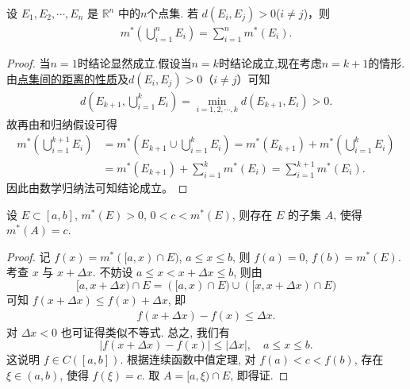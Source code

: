 \documentclass[../../main.tex]{subfiles}
\begin{document}
\begin{corollary}\label{corollary:距离大于零的两个点集的外测度满足可数可加性}
设 \(E_1, E_2,\cdots,E_n\) 是 \(\mathbb{R}^n\) 中的$n$个点集. 若 \(d(E_i, E_j)>0\)($i\ne j$)，则
\begin{align*}
m^*\left( \bigcup_{i=1}^n{E_i} \right) =\sum_{i=1}^n{m^*\left( E_i \right)}.
\end{align*}
\end{corollary}
\begin{proof}
当$n=1$时结论显然成立.假设当$n=k$时结论成立,现在考虑$n=k+1$的情形.由\hyperref[proposition:点集间的距离的性质]{点集间的距离的性质}及$d(E_i,E_j)>0$（$i\neq j$）可知
\begin{align*}
d\left(E_{k + 1},\bigcup_{i = 1}^kE_i\right)=\min_{i = 1,2,\cdots,k}d\left(E_{k + 1},E_i\right)>0.
\end{align*}
故再由和归纳假设可得
\begin{align*}
m^*\left(\bigcup_{i = 1}^{k + 1}E_i\right)&=m^*\left(E_{k + 1}\cup\bigcup_{i = 1}^kE_i\right)=m^*\left(E_{k + 1}\right)+m^*\left(\bigcup_{i = 1}^kE_i\right)\\
&=m^*\left(E_{k + 1}\right)+\sum_{i = 1}^km^*(E_i)
=\sum_{i = 1}^{k + 1}m^*(E_i).
\end{align*}
因此由数学归纳法可知结论成立。 
\end{proof}

\begin{proposition}\label{proposition:Lebesgue外测度的内介值性}
设 \(E \subset [a,b]\), \(m^*(E)>0\), \(0 < c < m^*(E)\), 则存在 \(E\) 的子集 \(A\), 使得 \(m^*(A)=c\).
\end{proposition}
\begin{proof}
记 \(f(x)=m^*([a,x) \cap E)\), \(a \leq x \leq b\), 则 \(f(a)=0\), \(f(b)=m^*(E)\). 考查 \(x\) 与 \(x + \Delta x\). 不妨设 \(a \leq x < x + \Delta x \leq b\), 则由
\[
[a,x + \Delta x) \cap E = ([a,x) \cap E) \cup ([x,x + \Delta x) \cap E)
\]
可知 \(f(x + \Delta x) \leq f(x) + \Delta x\), 即
\begin{align*}
f(x + \Delta x) - f(x) \leq \Delta x.
\end{align*}
对 \(\Delta x < 0\) 也可证得类似不等式. 总之, 我们有
\[
|f(x + \Delta x) - f(x)| \leq |\Delta x|, \quad a \leq x \leq b.
\]
这说明 \(f \in C([a,b])\). 根据连续函数中值定理, 对 \(f(a) < c < f(b)\), 存在 \(\xi \in (a,b)\), 使得 \(f(\xi)=c\). 取 \(A = [a,\xi) \cap E\), 即得证.
\end{proof}
\end{document}
